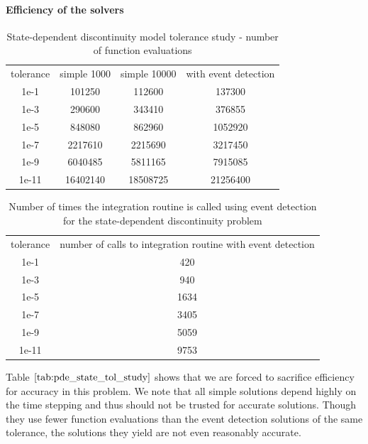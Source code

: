 \documentclass{article}
\begin{document}
\paragraph{Efficiency of the solvers}
\begin{table}[h]
\caption {State-dependent discontinuity model tolerance study - number of function evaluations} 
\label{tab:pde_state_tol_study}
\begin{center}
\begin{tabular}{ c c c c } 
tolerance & simple 1000 & simple 10000 & with event detection \\ 
1e-1      &             101250   &              112600   &   137300 \\
1e-3      &             290600   &              343410   &   376855 \\
1e-5      &             848080   &              862960   &  1052920 \\
1e-7      &            2217610     &           2215690   &  3217450\\
1e-9      &            6040485     &           5811165   &  7915085  \\
1e-11     &           16402140     &          18508725   & 21256400 \\
\end{tabular}
\end{center}
\end{table}

\begin{table}[h]
\caption {Number of times the integration routine is called using event detection for the state-dependent discontinuity problem} 
\label{tab:pde_state_tol_num_integrations}
\begin{center}
\begin{tabular}{ c c } 
tolerance & number of calls to integration routine with event detection \\ 
1e-1      &    420 \\
1e-3      &    940 \\
1e-5      & 1634 \\
1e-7      & 3405 \\
1e-9      & 5059 \\
1e-11     & 9753 \\
\end{tabular}
\end{center}
\end{table}

Table $\ref{tab:pde_state_tol_study}$ shows that we are forced to sacrifice efficiency for accuracy in this problem. We note that all simple solutions depend highly on the time stepping and thus should not be trusted for accurate solutions. Though they use fewer function evaluations than the event detection solutions of the same tolerance, the solutions they yield are not even reasonably accurate. 
\end{document}
